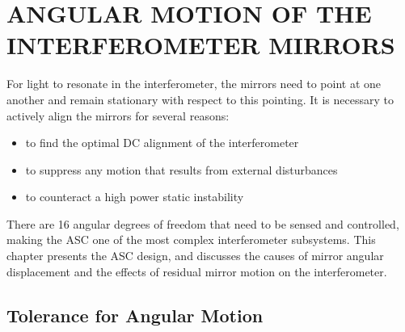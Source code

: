 \chapter{ANGULAR MOTION OF THE INTERFEROMETER MIRRORS}

For light to resonate in the interferometer, the mirrors need to point at one another and remain stationary with respect to this pointing. It is necessary to actively align the mirrors for several reasons:
\begin{itemize}
\item to find the optimal DC alignment of the interferometer \vspace{-10 pt}
\item to suppress any motion that results from external disturbances \vspace{-10 pt}
\item to counteract a high power static instability
\end{itemize}
There are 16 angular degrees of freedom that need to be sensed and controlled, making the ASC one of the most complex interferometer subsystems. This chapter presents the ASC design, and discusses the causes of mirror angular displacement and the effects of residual mirror motion on the interferometer. 












\section{Tolerance for Angular Motion}
\label{sec:tolerance}


